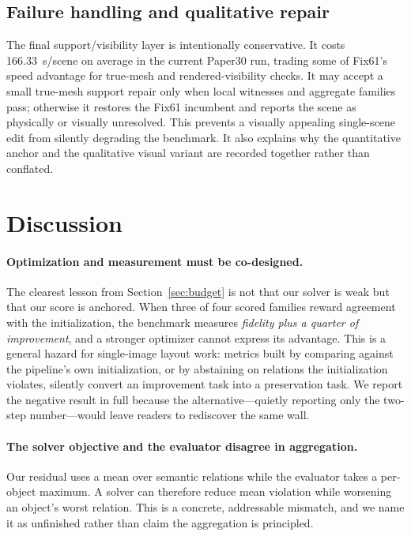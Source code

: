 \documentclass[10pt,twocolumn]{article}
\begin{document}
\subsection{Failure handling and qualitative repair}

The final support/visibility layer is intentionally conservative.  It costs
166.33~s/scene on average in the current Paper30 run, trading some of Fix61's
speed advantage for true-mesh and rendered-visibility checks.  It may
accept a small true-mesh support repair only when local witnesses and aggregate
families pass; otherwise it restores the Fix61 incumbent and reports the scene
as physically or visually unresolved.  This prevents a visually appealing
single-scene edit from silently degrading the benchmark.  It also explains why
the quantitative anchor and the qualitative visual variant are recorded
together rather than conflated.

\section{Discussion}

\paragraph{Optimization and measurement must be co-designed.}
The clearest lesson from Section~\ref{sec:budget} is not that our solver is
weak but that our score is anchored.  When three of four scored families reward
agreement with the initialization, the benchmark measures \emph{fidelity plus a
quarter of improvement}, and a stronger optimizer cannot express its advantage.
This is a general hazard for single-image layout work: metrics built by
comparing against the pipeline's own initialization, or by abstaining on
relations the initialization violates, silently convert an improvement task
into a preservation task.  We report the negative result in full because the
alternative---quietly reporting only the two-step number---would leave readers
to rediscover the same wall.

\paragraph{The solver objective and the evaluator disagree in aggregation.}
Our residual uses a mean over semantic relations while the evaluator takes a
per-object maximum.  A solver can therefore reduce mean violation while
worsening an object's worst relation.  This is a concrete, addressable
mismatch, and we name it as unfinished rather than claim the aggregation is
principled.
\end{document}
